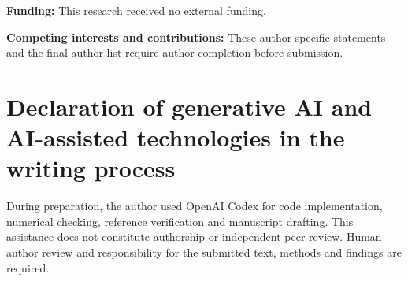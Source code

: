 \documentclass[preprint,12pt]{elsarticle}
\begin{document}
\textbf{Funding:} This research received no external funding.

\textbf{Competing interests and contributions:} These author-specific statements and the final author list require author completion before submission.

\section*{Declaration of generative AI and AI-assisted technologies in the writing process}
During preparation, the author used OpenAI Codex for code implementation, numerical checking, reference verification and manuscript drafting. This assistance does not constitute authorship or independent peer review. Human author review and responsibility for the submitted text, methods and findings are required.



\end{document}
